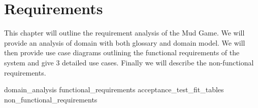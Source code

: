 \chapter{Requirements}
This chapter will outline the requirement analysis of the Mud Game. We will provide an analysis of domain with both glossary and domain model. We will then provide use case diagrams outlining the functional requirements of the system and give 3 detailed use cases. Finally we will describe the non-functional requirements.

{domain_analysis}
{functional_requirements}
{acceptance_test_fit_tables}
{non_functional_requirements}